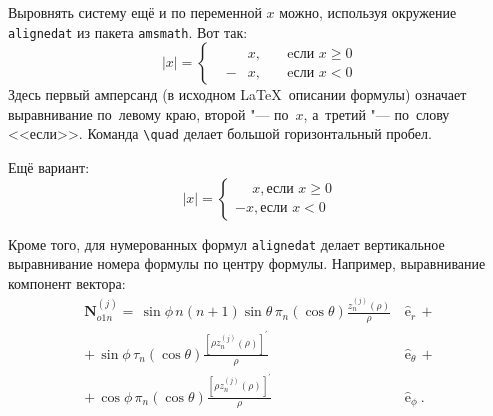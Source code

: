 Выровнять систему ещё и по переменной \( x \) можно, используя окружение
\verb|alignedat| из пакета \verb|amsmath|. Вот так:
\[
|x| = \left\{
\begin{alignedat}{2}
     &   & x, \quad & \text{eсли } x\geqslant 0 \\
     & - & x, \quad & \text{eсли } x<0
\end{alignedat}
\right.
\]
Здесь первый амперсанд (в исходном \LaTeX\ описании формулы) означает
выравнивание по~левому краю, второй "--- по~\( x \), а~третий "--- по~слову
<<если>>. Команда \verb|\quad| делает большой горизонтальный пробел.

Ещё вариант:
\[
    |x|=
    \begin{cases}
        \phantom{-}x, \text{если } x \geqslant 0 \\
        -x, \text{если } x<0
    \end{cases}
\]

Кроме того, для  нумерованных формул \verb|alignedat| делает вертикальное
выравнивание номера формулы по центру формулы. Например, выравнивание
компонент вектора:
\begin{equation}
    \label{eq:2p3}
    \begin{alignedat}{2}
        {\mathbf{N}}_{o1n}^{(j)} = \,{\sin} \phi\,n\!\left(n+1\right)
        {\sin}\theta\,
        \pi_n\!\left({\cos} \theta\right)
        \frac{
        z_n^{(j)}\!\left( \rho \right)
        }{\rho}\,
         & {\boldsymbol{\hat{\mathrm e}}}_{r}\,+      \\
        +\,
        {\sin} \phi\,
        \tau_n\!\left({\cos} \theta\right)
        \frac{
        \left[\rho z_n^{(j)}\!\left( \rho \right)\right]^{\prime}
        }{\rho}\,
         & {\boldsymbol{\hat{\mathrm e}}}_{\theta}\,+ \\
        +\,
        {\cos} \phi\,
        \pi_n\!\left({\cos} \theta\right)
        \frac{
        \left[\rho z_n^{(j)}\!\left( \rho \right)\right]^{\prime}
        }{\rho}\,
         & {\boldsymbol{\hat{\mathrm e}}}_{\phi}\:.
    \end{alignedat}
\end{equation}

